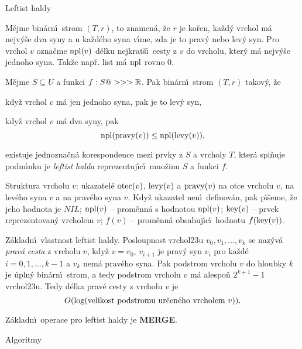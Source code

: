 \heading
Leftist haldy
\endheading

\flushpar M\v ejme bin\'arn\'\i\ strom $(T,r)$, to znamen\'a, \v ze $
r$ je ko\v ren, 
ka\v zd\'y vrchol m\'a nejv\'y\v se dva syny a u ka\v zd\'eho syna 
v\'\i me, zda je to prav\'y nebo lev\'y syn. Pro vrchol $v$ 
ozna\v cme $\operatorname{npl}(v)$ d\'elku nejkrat\v s\'\i\ cesty z $v$ do vrcholu, kter\'y m\'a 
nejv\'y\v se jednoho syna. Tak\v ze nap\v r. list m\'a $\operatorname{npl}$ rovno $
0$.
\medskip

\flushpar M\v ejme $S\subseteq U$ a funkci $f:S@>>>\Bbb R$. Pak bin\'arn\'\i\ strom 
$(T,r)$ takov\'y, \v ze
\roster
\item
kdy\v z vrchol $v$ m\'a jen jednoho syna, pak je to lev\'y syn,
\item
kdy\v z vrchol $v$ m\'a dva syny, pak 
$$\operatorname{npl}(\operatorname{pravy}(v))\le\operatorname{npl}(\operatorname{levy}(v)),$$
\item
existuje jednozna\v cn\'a korespondence mezi prvky z $S$ a 
vrcholy $T$, kter\'a spl\v nuje podm\'\i nku 
\endroster
je \emph{leftist} \emph{halda} 
reprezentuj\'\i c\'\i\ mno\v zinu $S$ a funkci $f$. 
\medskip

\flushpar Struktura vrcholu $v$:\newline 
ukazatel\'e $\operatorname{otec}(v)$, $\operatorname{levy}(v)$ a $\operatorname{pravy}(v)$ na otce vrcholu $
v$, 
na lev\'eho syna $v$ a na prav\'eho syna $v$. Kdy\v z ukazatel 
nen\'\i\ definov\'an, pak p\'\i\v seme, \v ze jeho hodnota je 
$NIL$;\newline 
$\operatorname{npl}(v)$ -- prom\v enn\'a s hodnotou $\operatorname{npl}(v)$;\newline 
$\operatorname{key}(v)$ -- prvek reprezentovan\'y vrcholem $v$;\newline 
$f(v)$ -- prom\v enn\'a obsahuj\'\i c\'\i\ hodnotu $f(\operatorname{key}(v))$.
\medskip

\flushpar Z\'akladn\'\i\ vlastnost leftist haldy.\newline 
Posloupnost vrchol\accent23u $v_0,v_1,\dots,v_k$ se naz\'yv\'a 
\emph{prav\'a} \emph{cesta} z vrcholu $v$, kdy\v z $v=v_0$, $v_{i
+1}$ 
je prav\'y syn $v_i$ pro ka\v zd\'e $i=0,1,\dots,k-1$ a $v_k$ nem\'a 
prav\'eho syna. Pak podstrom vrcholu $v$ do hloubky $k$ je 
\'upln\'y bin\'arn\'\i\ strom, a tedy podstrom vrcholu $v$ m\'a 
alespo\v n $2^{k+1}-1$ vrchol\accent23u. Tedy d\'elka prav\'e 
cesty z vrcholu $v$ je 
$$O(\log(\text{\rm velikost podstromu ur\v cen\'eho vrcholem }v)).$$
\medskip

\flushpar Z\'akladn\'\i\ operace pro leftist haldy je {\bf MERGE}.
\bigskip

\subhead
Algoritmy
\endsubhead
\medskip

